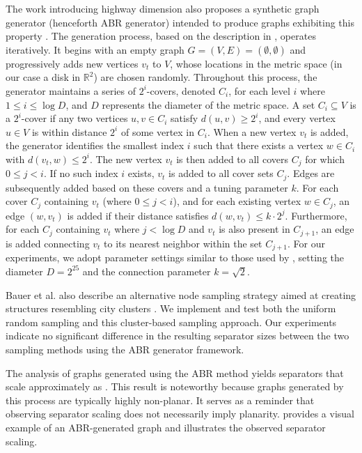 The work introducing highway dimension also proposes a synthetic graph generator (henceforth ABR generator) intended to produce graphs exhibiting this property \cite{abraham_highway_2010}.
The generation process, based on the description in \cite{hutchison_synthetic_2010}, operates iteratively.
It begins with an empty graph \( G = (V, E) = (\emptyset, \emptyset) \) and progressively adds new vertices \(v_t\) to \(V\), whose locations in the metric space (in our case a disk in \(\mathbb{R}^2\)) are chosen randomly.
Throughout this process, the generator maintains a series of \(2^i\)-covers, denoted \(C_i\), for each level \(i\) where \(1 \leq i \leq \log D\), and \(D\) represents the diameter of the metric space.
A set \(C_i \subseteq V\) is a \(2^i\)-cover if any two vertices \(u, v \in C_i\) satisfy \(d(u, v) \geq 2^i\), and every vertex \(u \in V\) is within distance \(2^i\) of some vertex in \(C_i\).
When a new vertex \(v_t\) is added, the generator identifies the smallest index \(i\) such that there exists a vertex \(w \in C_i\) with \(d(v_t, w) \leq 2^i\).
The new vertex \(v_t\) is then added to all covers \(C_j\) for which \(0 \leq j < i\).
If no such index \(i\) exists, \(v_t\) is added to all cover sets \(C_j\).
Edges are subsequently added based on these covers and a tuning parameter \(k\).
For each cover \(C_j\) containing \(v_t\) (where \(0 \leq j < i\)), and for each existing vertex \(w \in C_j\), an edge \((w, v_t)\) is added if their distance satisfies \(d(w, v_t) \leq k \cdot 2^j\).
Furthermore, for each \(C_j\) containing \(v_t\) where \(j < \log D\) and \(v_t\) is also present in \(C_{j+1}\), an edge is added connecting \(v_t\) to its nearest neighbor within the set \(C_{j+1}\).
For our experiments, we adopt parameter settings similar to those used by \cite{hutchison_synthetic_2010}, setting the diameter \(D = 2^{25}\) and the connection parameter \(k = \sqrt{2}\).

Bauer et al. also describe an alternative node sampling strategy aimed at creating structures resembling city clusters \cite{hutchison_synthetic_2010}.
We implement and test both the uniform random sampling and this cluster-based sampling approach.
Our experiments indicate no significant difference in the resulting separator sizes between the two sampling methods using the ABR generator framework.

The analysis of graphs generated using the ABR method yields separators that scale approximately as .
This result is noteworthy because graphs generated by this process are typically highly non-planar.
It serves as a reminder that observing  separator scaling does not necessarily imply planarity.
 provides a visual example of an ABR-generated graph and illustrates the observed separator scaling.

